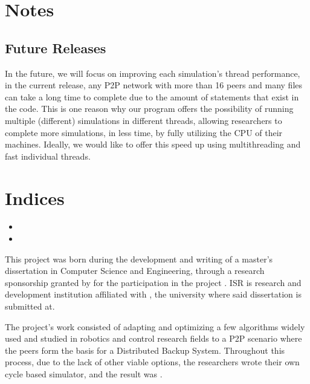 \documentclass[letterpaper,10pt,english]{sphinxmanual}
\begin{document}
\chapter{Notes}
\label{\detokenize{notedocs:notes}}\label{\detokenize{notedocs::doc}}

\section{Future Releases}
\label{\detokenize{notedocs:future-releases}}
In the future, we will focus on improving each simulation’s thread performance,
in the current release, any P2P network with more than 16 peers and many files
can take a long time to complete due to the amount of  statements that
exist in the code. This is one reason why our program offers the possibility
of running multiple (different) simulations in different threads, allowing
researchers to complete more simulations, in less time, by fully utilizing the
CPU of their machines. Ideally, we would like to offer this speed up using
multi\sphinxhyphen{}threading and fast individual threads.


\chapter{Indices}
\label{\detokenize{indices:indices}}\label{\detokenize{indices::doc}}\begin{itemize}
\item {} 

\item {} 

\end{itemize}

This project was born during the development and writing of a master’s
dissertation in Computer Science and Engineering, through a research
sponsorship granted by  for the participation in the project
. ISR is research and
development institution affiliated with , the university where said
dissertation is submitted at.

The project’s work consisted of adapting and optimizing a few algorithms widely
used and studied in robotics and control research fields to a P2P scenario
where the peers form the basis for a Distributed Backup System. Throughout this
process, due to the lack of other viable options, the researchers wrote their
own cycle based simulator, and the result was .
\end{document}
